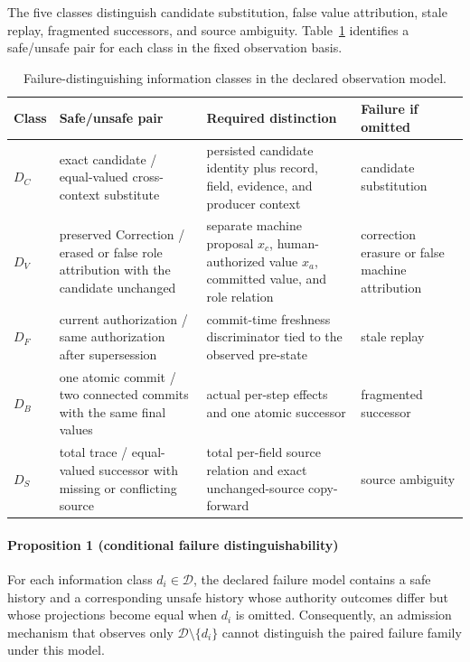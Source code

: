 The five classes distinguish candidate substitution, false value attribution, stale replay, fragmented successors, and source ambiguity. Table~\ref{tab:distinctions} identifies a safe/unsafe pair for each class in the fixed observation basis.

\begin{table}[t]
\centering
\footnotesize
\caption{Failure-distinguishing information classes in the declared observation model.}
\label{tab:distinctions}
\begin{tabularx}{\textwidth}{@{}l>{\raggedright\arraybackslash}p{}>{\raggedright\arraybackslash}p{}>{\raggedright\arraybackslash}X@{}}
\toprule
Class & Safe/unsafe pair & Required distinction & Failure if omitted \\
\midrule
$D_C$ & exact candidate / equal-valued cross-context substitute & persisted candidate identity plus record, field, evidence, and producer context & candidate substitution \\
$D_V$ & preserved Correction / erased or false role attribution with the candidate unchanged & separate machine proposal $x_c$, human-authorized value $x_a$, committed value, and role relation & correction erasure or false machine attribution \\
$D_F$ & current authorization / same authorization after supersession & commit-time freshness discriminator tied to the observed pre-state & stale replay \\
$D_B$ & one atomic commit / two connected commits with the same final values & actual per-step effects and one atomic successor & fragmented successor \\
$D_S$ & total trace / equal-valued successor with missing or conflicting source & total per-field source relation and exact unchanged-source copy-forward & source ambiguity \\
\bottomrule
\end{tabularx}
\end{table}

\paragraph{Proposition 1 (conditional failure distinguishability)}
For each information class $d_i\in\mathcal D$, the declared failure model contains a safe history and a corresponding unsafe history whose authority outcomes differ but whose projections become equal when $d_i$ is omitted. Consequently, an admission mechanism that observes only $\mathcal D\setminus\{d_i\}$ cannot distinguish the paired failure family under this model.

